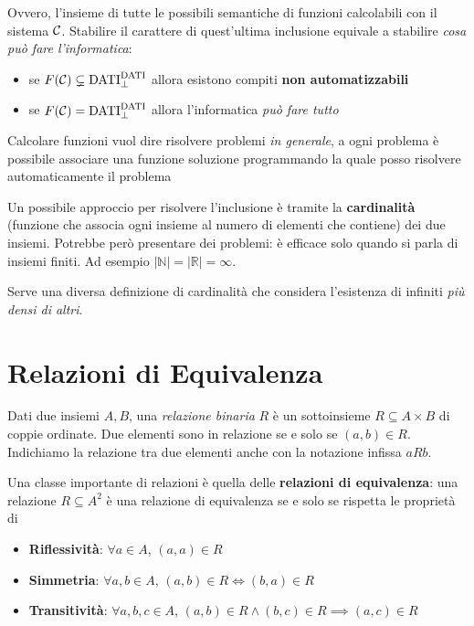 Ovvero, l'insieme di tutte le possibili semantiche di funzioni calcolabili con il sistema $\mathcal{C}$. Stabilire il carattere di quest'ultima inclusione equivale a stabilire \textit{cosa può fare l'informatica}:
\begin{itemize}
	\item se $F(\mathcal{C}) \subsetneq \text{DATI}_\bot^{\text{DATI}}$ allora esistono compiti \textbf{non automatizzabili}
	
    \item se $F(\mathcal{C}) = \text{DATI}_\bot^{\text{DATI}}$ allora l'informatica \textit{può fare tutto}
\end{itemize}

Calcolare funzioni vuol dire risolvere problemi \textit{in generale}, a ogni problema è possibile associare una funzione soluzione programmando la quale posso risolvere automaticamente il problema

Un possibile approccio per risolvere l'inclusione è tramite la \textbf{cardinalità} (funzione che associa ogni insieme al numero di elementi che contiene) dei due insiemi. Potrebbe però presentare dei problemi: è efficace solo quando si parla di insiemi finiti. Ad esempio $|\mathbb{N}| = |\mathbb{R}| = \infty$.

Serve una diversa definizione di cardinalità che considera l'esistenza di infiniti \textit{più densi di altri}.

\section{Relazioni di Equivalenza}
Dati due insiemi $A,B$, una \textit{relazione binaria} $R$ è un sottoinsieme $R \subseteq A \times B$ di coppie ordinate. Due elementi sono in relazione se e solo se $(a,b) \in R$. Indichiamo la relazione tra due elementi anche con la notazione infissa $aRb$.

Una classe importante di relazioni è quella delle \textbf{relazioni di equivalenza}: una relazione $R \subseteq A^2$ è una relazione di equivalenza se e solo se rispetta le proprietà di
\begin{itemize}
	\item \textbf{Riflessività}: $\forall a \in A$, $(a,a) \in R$
	
    \item \textbf{Simmetria}: $\forall a,b \in A$, $(a,b) \in R \Leftrightarrow (b,a) \in R$
	
    \item \textbf{Transitività}: $\forall a,b,c \in A$, $(a,b) \in R \wedge (b,c) \in R \implies (a,c) \in R$
\end{itemize}

